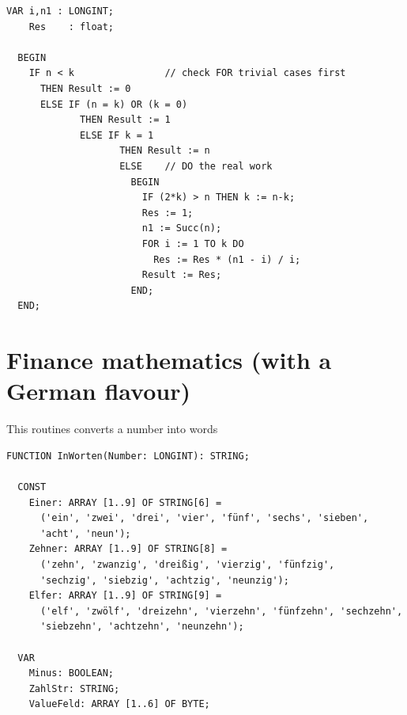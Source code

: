 \begin{refsection}
\begin{lstlisting}[caption=binomial coefficient]
  VAR i,n1 : LONGINT;
    Res    : float;

  BEGIN
    IF n < k                // check FOR trivial cases first
      THEN Result := 0
      ELSE IF (n = k) OR (k = 0)
             THEN Result := 1
             ELSE IF k = 1
                    THEN Result := n
                    ELSE    // DO the real work
                      BEGIN
                        IF (2*k) > n THEN k := n-k;
                        Res := 1;
                        n1 := Succ(n);
                        FOR i := 1 TO k DO
                          Res := Res * (n1 - i) / i;
                        Result := Res;
                      END;
  END;
\end{lstlisting}


\section{Finance mathematics (with a German flavour)}

This routines converts a number into words

\begin{lstlisting}[caption=Finance mathematics]
  FUNCTION InWorten(Number: LONGINT): STRING;

  CONST
    Einer: ARRAY [1..9] OF STRING[6] =
      ('ein', 'zwei', 'drei', 'vier', 'fünf', 'sechs', 'sieben',
      'acht', 'neun');
    Zehner: ARRAY [1..9] OF STRING[8] =
      ('zehn', 'zwanzig', 'dreißig', 'vierzig', 'fünfzig',
      'sechzig', 'siebzig', 'achtzig', 'neunzig');
    Elfer: ARRAY [1..9] OF STRING[9] =
      ('elf', 'zwölf', 'dreizehn', 'vierzehn', 'fünfzehn', 'sechzehn',
      'siebzehn', 'achtzehn', 'neunzehn');

  VAR
    Minus: BOOLEAN;
    ZahlStr: STRING;
    ValueFeld: ARRAY [1..6] OF BYTE;


\end{lstlisting}
\end{refsection}
